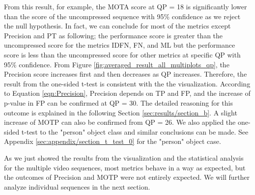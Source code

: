 
From this result, for example, the MOTA score at QP = 18 is significantly lower than the score of the uncompressed sequence with 95\% confidence as we reject the null hypothesis. In fact, we can conclude for most of the metrics except Precision and PT as following; the performance score is greater than the uncompressed score for the metrics IDFN, FN, and ML but the performance score is less than the uncompressed score for other metrics at specific QP with 95\% confidence. From Figure \ref{fig:averaged_result_all_multiplots_qp}, the Precision score increases first and then decreases as QP increases. Therefore, the result from the one-sided t-test is consistent with the the visualization. According to Equation \ref{eqn:Precision}, Precision depends on TP and FP, and the increase of p-value in FP can be confirmed at QP = 30. The detailed reasoning for this outcome is explained in the following Section \ref{sec:results/section_b}. A slight increase of MOTP can also be confirmed from QP = 26. We also applied the one-sided t-test to the "person" object class and similar conclusions can be made. See Appendix \ref{sec:appendix/section_t_test_0} for the "person" object case.

As we just showed the results from the visualization and the statistical analysis for the multiple video sequences, most metrics behave in a way as expected, but the outcomes of Precision and MOTP were not entirely expected. We will further analyze individual sequences in the next section.


